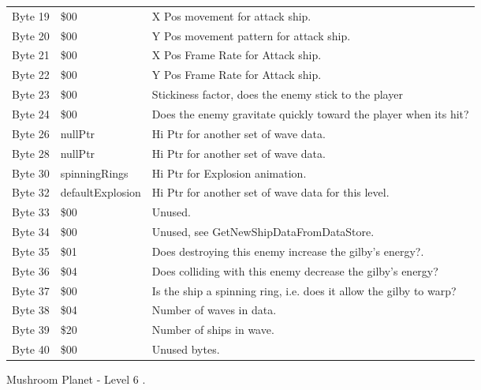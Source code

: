 \begin{figure}[H]
{\begin{adjustbox}{width=12cm}
\begin{tabular}{lll}
 Byte 19 & \$00                       & X Pos movement for attack ship.                                    \\
 Byte 20 & \$00                       & Y Pos movement pattern for attack ship.                            \\
 Byte 21 & \$00                       & X Pos Frame Rate for Attack ship.                                  \\
 Byte 22 & \$00                       & Y Pos Frame Rate for Attack ship.                                  \\
 Byte 23 & \$00                       & Stickiness factor, does the enemy stick to the player              \\
 Byte 24 & \$00                       & Does the enemy gravitate quickly toward the player when its hit?   \\
 Byte 26 & nullPtr                   & Hi Ptr for another set of wave data.                               \\
 Byte 28 & nullPtr                   & Hi Ptr for another set of wave data.                               \\
 Byte 30 & spinningRings             & Hi Ptr for Explosion animation.                                    \\
 Byte 32 & defaultExplosion          & Hi Ptr for another set of wave data for this level.                \\
 Byte 33 & \$00                       & Unused.                                                            \\
 Byte 34 & \$00                       & Unused, see GetNewShipDataFromDataStore.                           \\
 Byte 35 & \$01                       & Does destroying this enemy increase the gilby's energy?.           \\
 Byte 36 & \$04                       & Does colliding with this enemy decrease the gilby's energy?        \\
 Byte 37 & \$00                       & Is the ship a spinning ring, i.e. does it allow the gilby to warp? \\
 Byte 38 & \$04                       & Number of waves in data.                                           \\
 Byte 39 & \$20                       & Number of ships in wave.                                           \\
 Byte 40 & \$00                       & Unused bytes.                                                      \\
\bottomrule
\end{tabular}

  \end{adjustbox}

  }\caption*{Mushroom Planet - Level 6
.}
\end{figure}

